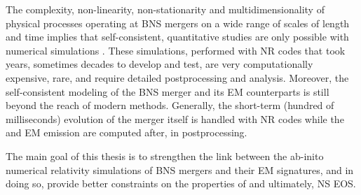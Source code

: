 The complexity, non-linearity, non-stationarity and multidimensionality of physical 
processes operating at \ac{BNS} mergers on a wide range of scales of length and time 
implies that self-consistent, quantitative studies are only possible with numerical 
simulations 
\citep{Sekiguchi:2011zd,Wanajo:2014wha,Foucart:2015gaa,Palenzuela:2015dqa,Sekiguchi:2016bjd,Kiuchi:2017zzg,Radice:2017zta,Fujibayashi:2017puw,Radice:2018pdn}.
%
These simulations, performed with \ac{NR} codes that took years, sometimes 
decades to develop and test, are very computationally expensive, rare, and require detailed 
postprocessing and analysis. 
%
Moreover, the self-consistent modeling of the \ac{BNS} merger and its \ac{EM} counterparts 
is still beyond the reach of modern methods. Generally, the short-term (hundred of milliseconds) 
evolution of the merger itself is handled with \ac{NR} codes while the 
\nuc{} and \ac{EM} emission are computed after, in postprocessing. 
%

%
The main goal of this thesis is to strengthen the link between the ab-inito 
numerical relativity simulations of \ac{BNS} mergers and their 
\ac{EM} signatures, 
and in doing so, provide better constraints on the properties of \GW{} 
and ultimately, \ac{NS} \ac{EOS}.



